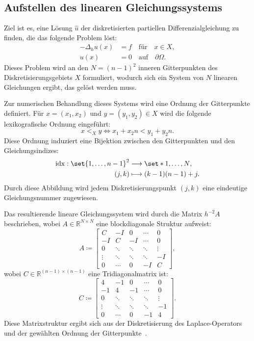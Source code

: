 \documentclass{scrartcl}
\newcommand\R{\mathbb{R}}
\begin{document}
\subsection{Aufstellen des linearen Gleichungssystems}

Ziel ist es, eine Lösung \(\hat u\) der diskretisierten partiellen
Differenzialgleichung zu finden, die das folgende Problem löst:
\begin{align*}
    -\Delta_{h} u(x) & = f \quad \text{für} \quad x \in X,         \\
    u(x)             & = 0 \quad \text{auf} \quad \partial \Omega.
\end{align*}
Dieses Problem wird an den \(N = {(n-1)}^2\) inneren Gitterpunkten des
Diskretisierungsgebiets \(X\) formuliert, wodurch sich ein System von \(N\)
linearen Gleichungen ergibt, das gelöst werden muss.

Zur numerischen Behandlung dieses Systems wird eine Ordnung der Gitterpunkte
definiert. Für \(x = (x_1, x_2)\) und \(y = (y_1, y_2) \in X\) wird die
folgende lexikografische Ordnung eingeführt:
\[
    x <_{X} y \iff x_1 + x_2n < y_1 + y_2n.
\]
Diese Ordnung induziert eine Bijektion zwischen den Gitterpunkten und den
  Gleichungsindizes:
\begin{align*}
    \operatorname{idx}: \set{1, \ldots, n - 1}^2 & \longrightarrow \set*{1, \ldots , N}, \\
    (j, k)                                       & \longmapsto (k - 1)(n - 1) + j.
\end{align*}
Durch diese Abbildung wird jedem Diskretisierungspunkt \((j, k)\) eine eindeutige
Gleichungsnummer zugewiesen.

Das resultierende lineare Gleichungssystem wird durch die Matrix \(h^{-2}A\)
beschrieben, wobei \(A \in \R^{N \times N}\) eine blockdiagonale Struktur
aufweist:
\[
    A \coloneq \begin{bmatrix}
        C      & -I     & 0      & \cdots & 0      \\
        -I     & C      & -I     & \cdots & 0      \\
        0      & \ddots & \ddots & \ddots & \vdots \\
        \vdots & \ddots & \ddots & \ddots & -I     \\
        0      & \cdots & 0      & -I     & C
    \end{bmatrix},
\]
wobei \(C \in \R^{(n-1) \times (n-1)}\) eine Tridiagonalmatrix ist:
\[
    C \coloneq \begin{bmatrix}
        4      & -1     & 0      & \cdots & 0      \\
        -1     & 4      & -1     & \cdots & 0      \\
        0      & \ddots & \ddots & \ddots & \vdots \\
        \vdots & \ddots & \ddots & \ddots & -1     \\
        0      & \cdots & 0      & -1     & 4
    \end{bmatrix}.
\]
Diese Matrixstruktur ergibt sich aus der Diskretisierung des
  Laplace-Operators und der gewählten Ordnung der
  Gitterpunkte~\cite{PPI_Poisson}.
\end{document}
